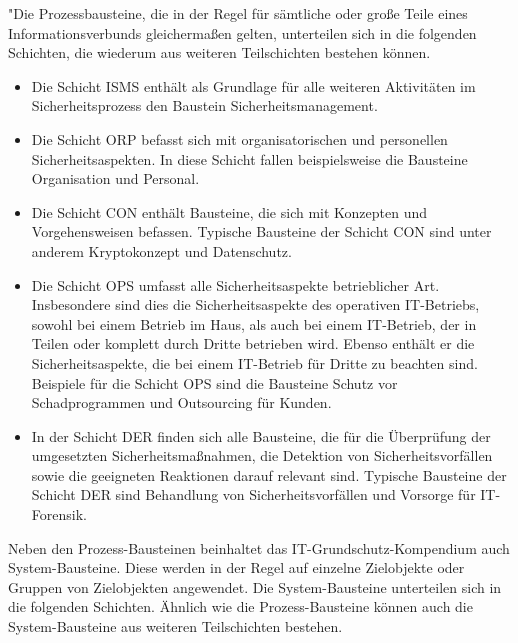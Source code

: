 "Die Prozessbausteine, die in der Regel für sämtliche oder große Teile eines Informationsverbunds gleichermaßen
gelten, unterteilen sich in die folgenden Schichten, die wiederum aus weiteren Teilschichten bestehen können.
\begin{itemize}
	\item Die Schicht ISMS enthält als Grundlage für alle weiteren Aktivitäten im Sicherheitsprozess den Baustein Sicherheitsmanagement.
	\item Die Schicht ORP befasst sich mit organisatorischen und personellen Sicherheitsaspekten. In diese Schicht fallen beispielsweise die Bausteine Organisation und Personal.
	\item Die Schicht CON enthält Bausteine, die sich mit Konzepten und Vorgehensweisen befassen. Typische Bausteine
	der Schicht CON sind unter anderem Kryptokonzept und Datenschutz.
	\item Die Schicht OPS umfasst alle Sicherheitsaspekte betrieblicher Art. Insbesondere sind dies die Sicherheitsaspekte des operativen IT-Betriebs, sowohl bei einem Betrieb im Haus, als auch bei einem IT-Betrieb, der in Teilen oder komplett durch Dritte betrieben wird. Ebenso enthält er die Sicherheitsaspekte, die bei einem IT-Betrieb für Dritte zu beachten sind. Beispiele für die Schicht OPS sind die Bausteine Schutz vor Schadprogrammen und Outsourcing für Kunden.
	\item In der Schicht DER finden sich alle Bausteine, die für die Überprüfung der umgesetzten Sicherheitsmaßnahmen, die Detektion von Sicherheitsvorfällen sowie die geeigneten Reaktionen darauf relevant sind. Typische Bausteine der Schicht DER sind Behandlung von Sicherheitsvorfällen und Vorsorge für IT-Forensik.
\end{itemize}
Neben den Prozess-Bausteinen beinhaltet das IT-Grundschutz-Kompendium auch System-Bausteine. Diese werden
in der Regel auf einzelne Zielobjekte oder Gruppen von Zielobjekten angewendet. Die System-Bausteine unterteilen sich in die folgenden Schichten. Ähnlich wie die Prozess-Bausteine können auch die System-Bausteine aus weiteren Teilschichten bestehen.

